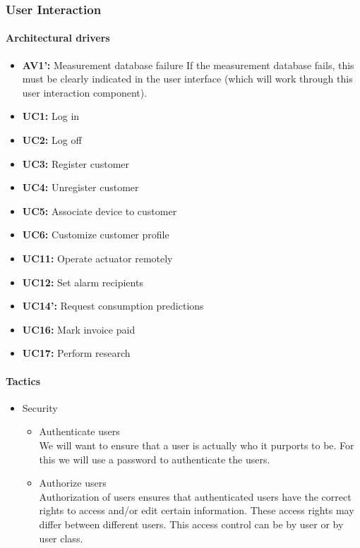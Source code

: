 \subsubsection{User Interaction}

\paragraph{Architectural drivers}
\begin{itemize}
	\item \textbf{AV1': } Measurement database failure
		If the measurement database fails, this must be clearly indicated in the user interface (which will work through this user interaction component).
	\item \textbf{UC1: } Log in
	\item \textbf{UC2: } Log off
	\item \textbf{UC3: } Register customer
	\item \textbf{UC4: } Unregister customer
	\item \textbf{UC5: } Associate device to customer
	\item \textbf{UC6: } Customize customer profile
	\item \textbf{UC11: } Operate actuator remotely
	\item \textbf{UC12: } Set alarm recipients
	\item \textbf{UC14': } Request consumption predictions
	\item \textbf{UC16: } Mark invoice paid
	\item \textbf{UC17: } Perform research
\end{itemize}


\paragraph{Tactics}
\begin{itemize}
	\item Security
	\begin{itemize}
		\item Authenticate users \\
		We will want to ensure that a user is actually who it purports to be.
		For this we will use a password to authenticate the users.
		\item Authorize users \\
		Authorization of users ensures that authenticated users have the correct
			rights to access and/or edit certain information. These access rights
			may differ between different users. This access control can be by user
			or by user class.
	\end{itemize}
\end{itemize}


